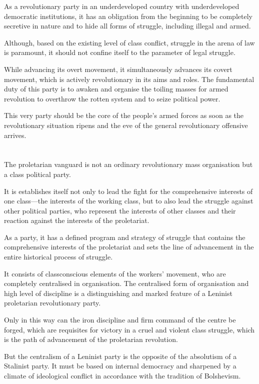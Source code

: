 \documentclass[a4paper,11pt,onesided]{report}
\begin{document}
As a revolutionary party in an underdeveloped country 
with underdeveloped democratic institutions, 
it has an obligation from the beginning 
to be completely secretive in nature 
and to hide all forms of struggle,
including illegal and armed.

Although, based on the existing level of class conflict,
struggle in the arena of law is paramount,
it should not confine itself to the parameter of legal struggle.

While advancing its overt movement, 
it simultaneously advances its covert movement,
which is actively revolutionary in its aims and roles. 
The fundamental duty of this party 
is to awaken and organise the toiling masses 
for armed revolution to overthrow the rotten system 
and to seize political power.

This very party 
should be the core of the people's armed forces 
as soon as the revolutionary situation ripens 
and the eve of the general revolutionary offensive arrives.


\section{}
The proletarian vanguard is not 
an ordinary revolutionary mass organisation 
but a class political party.

It is establishes itself 
not only to lead the fight for 
the comprehensive interests of one 
class---the interests of the working class,
but to also lead the struggle against other political parties,
who represent the interests of other classes 
and their reaction against the interests of the proletariat.

As a party, 
it has a defined program and strategy of struggle 
that contains the comprehensive interests 
of the proletariat 
and sets the line of advancement 
in the entire historical process of struggle.

It consists of classconscious elements of the workers' movement,
who are completely centralised in organisation. 
The centralised form of organisation 
and high level of discipline 
is a distinguishing and marked feature 
of a Leninist proletarian revolutionary party.

Only in this way can the iron discipline 
and firm command of the centre
be forged,
which are requisites for victory 
in a cruel and violent class struggle,
which is the path of advancement of the proletarian revolution.

But the centralism of a Leninist party 
is the opposite of the absolutism of a Stalinist party. 
It must be based on internal democracy 
and sharpened by a climate of ideological conflict 
in accordance with the tradition of Bolshevism.
\end{document}
